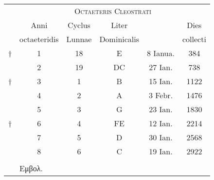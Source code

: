 %
%
\begin{tabular}[t]{r c c c c c}
~ & \multicolumn{5}{c}{\Large\textsc{Octaeteris Cleostrati}}\\
\cline{2-6}
~ &
\multicolumn{1}{c}{Anni} &
\multicolumn{1}{c}{Cyclus} &
\multicolumn{1}{c}{Liter} &
~ &
\multicolumn{1}{c}{Dies}
\\
~ &
\multicolumn{1}{c}{octaeteridis} &
\multicolumn{1}{c}{Lunnae} &
\multicolumn{1}{c}{Dominicalis} &
~ &
\multicolumn{1}{c}{collecti}
\\
\cline{2-6}
\scriptsize{†}
  &  1 & 18 &  E &  8 Ianua. &  384 \\
~ &  2 & 19 & DC & 27 Ian.   &  738 \\
\scriptsize{†}
  &  3 &  1 &  B & 15 Ian.   & 1122 \\
~ &  4 &  2 &  A &  3 Febr.  & 1476 \\
~ &  5 &  3 &  G & 23 Ian.   & 1830 \\
\scriptsize{†}
  &  6 &  4 & FE & 12 Ian.   & 2214 \\
~ &  7 &  5 &  D & 30 Ian.   & 2568 \\
~ &  8 &  6 &  C & 19 Ian.   & 2922 \\
\cline{2-6}
\\
~ & \multicolumn{5}{l}{\footnotesize \super{†} \textgreek{Εμβολ.}}\\
\end{tabular}
%
%
